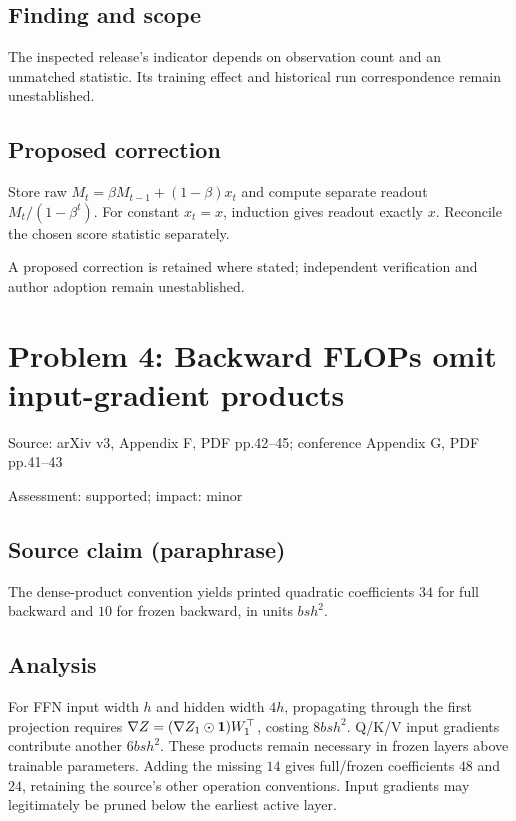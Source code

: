 \documentclass[11pt]{article}
\begin{document}
\subsection*{Finding and scope}

The inspected release’s indicator depends on observation count and an unmatched statistic. Its training effect and historical run correspondence remain unestablished.

\subsection*{Proposed correction}

Store raw \(M_t=\beta M_{t-1}+(1-\beta)x_t\) and compute separate readout \(M_t/(1-\beta^t)\). For constant \(x_t=x\), induction gives readout exactly \(x\). Reconcile the chosen score statistic separately.

A proposed correction is retained where stated; independent verification and author adoption remain unestablished.

\section*{Problem 4: Backward FLOPs omit input-gradient products}

Source: arXiv v3, Appendix F, PDF pp.42–45; conference Appendix G, PDF pp.41–43

Assessment: supported; impact: minor

\subsection*{Source claim (paraphrase)}

The dense-product convention yields printed quadratic coefficients \(34\) for full backward and \(10\) for frozen backward, in units \(bsh^2\).

\subsection*{Analysis}

For FFN input width \(h\) and hidden width \(4h\), propagating through the first projection requires \(\nabla Z=(\nabla Z_1\odot{\bf1})W_1^\top\), costing \(8bsh^2\). Q/K/V input gradients contribute another \(6bsh^2\). These products remain necessary in frozen layers above trainable parameters. Adding the missing \(14\) gives full/frozen coefficients \(48\) and \(24\), retaining the source’s other operation conventions. Input gradients may legitimately be pruned below the earliest active layer.
\end{document}
